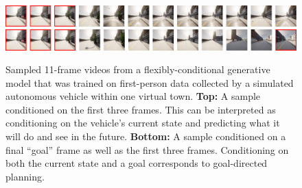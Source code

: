 \begin{figure}
    \centering
    \includegraphics[width=\textwidth]{figs/thesis/fdm-example-tasks/world-modeling-thesis.pdf}
    \includegraphics[width=\textwidth]{figs/thesis/fdm-example-tasks/visual-planning-thesis.pdf}
    \caption{Sampled 11-frame videos from a flexibly-conditional generative model that was trained on first-person data collected by a simulated autonomous vehicle within one virtual town. \textbf{Top:} A sample conditioned on the first three frames. This can be interpreted as conditioning on the vehicle's current state and predicting what it will do and see in the future. \textbf{Bottom:} A sample conditioned on a final ``goal'' frame as well as the first three frames. Conditioning on both the current state and a goal corresponds to goal-directed planning. }
    \label{fig:intro-world-modeling-and-planning}
\end{figure}


